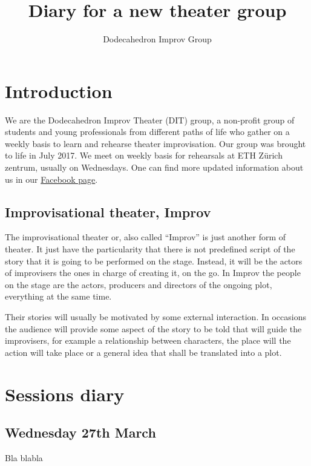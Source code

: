 \documentclass[11pt,a4paper,fleqn,twoside]{article}
\title{Diary for a new theater group}
\author{Dodecahedron Improv Group}
\begin{document}
\maketitle
\clearpage
\tableofcontents
\clearpage

\section{Introduction}

We are the Dodecahedron Improv Theater (DIT) group, a non-profit group of students and young professionals from different paths of life who gather on a weekly basis to learn and rehearse theater improvisation. Our group was brought to life in July 2017. We meet on weekly basis for rehearsals at ETH Zürich zentrum, usually on Wednesdays. One can find more updated information about us in our \href{https://www.facebook.com/dodecahedronimprovtheater/}{Facebook page}.

\subsection{Improvisational theater, Improv}

The improvisational theater or, also called ``Improv'' is just another form of theater. It just have the particularity that there is not predefined script of the story that it is going to be performed on the stage. Instead, it will be the actors of improvisers the ones in charge of creating it, on the go. In Improv the people on the stage are the actors, producers and directors of the ongoing plot, everything at the same time.

Their stories will usually be motivated by some external interaction. In occasions the audience will provide some aspect of the story to be told that will guide the improvisers, for example a relationship between characters, the place will the action will take place or a general idea that shall be translated into a plot. 

\section{Sessions diary}

\subsection{Wednesday 27th March}

Bla blabla
\end{document}
